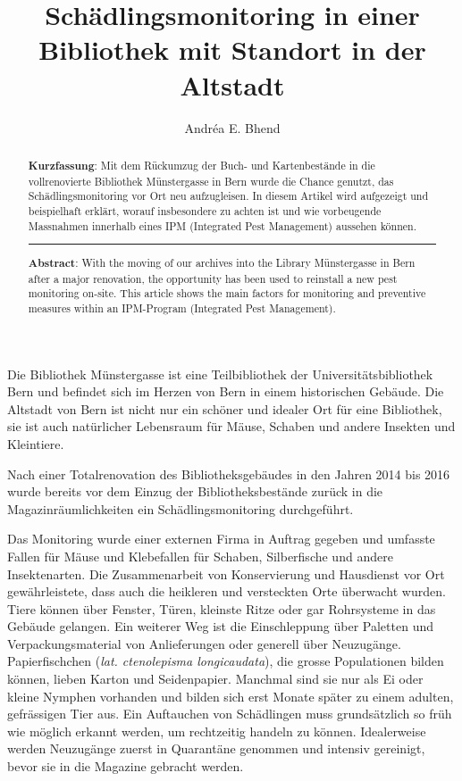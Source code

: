 \documentclass[a4paper,
fontsize=11pt,
oneside,
numbers=noperiodatend,
parskip=half-,
bibliography=totoc,
final
]{scrartcl}
\title{\LARGE{Schädlingsmonitoring in einer Bibliothek mit Standort in der Altstadt}}%
\author{Andréa E. Bhend} %
\date{}
\begin{document}
\maketitle
\thispagestyle{fancyplain} 

\begin{abstract}
\noindent
\textbf{Kurzfassung}: Mit dem Rückumzug der Buch- und Kartenbestände in
die vollrenovierte Bibliothek Münstergasse in Bern wurde die Chance
genutzt, das Schädlingsmonitoring vor Ort neu aufzugleisen. In diesem
Artikel wird aufgezeigt und beispielhaft erklärt, worauf insbesondere zu
achten ist und wie vorbeugende Massnahmen innerhalb eines IPM
(Integrated Pest Management) aussehen können.

\begin{center}\rule{0.5\linewidth}{0.5pt}\end{center}

\noindent\textbf{Abstract}: With the moving of our archives into the Library
Münstergasse in Bern after a major renovation, the opportunity has been
used to reinstall a new pest monitoring on-site. This article shows the
main factors for monitoring and preventive measures within an
IPM-Program (Integrated Pest Management).
\end{abstract}

Die Bibliothek Münstergasse ist eine Teilbibliothek der
Universitätsbibliothek Bern und befindet sich im Herzen von Bern in
einem historischen Gebäude. Die Altstadt von Bern ist nicht nur ein
schöner und idealer Ort für eine Bibliothek, sie ist auch natürlicher
Lebensraum für Mäuse, Schaben und andere Insekten und Kleintiere.

Nach einer Totalrenovation des Bibliotheksgebäudes in den Jahren 2014
bis 2016 wurde bereits vor dem Einzug der Bibliotheksbestände zurück in
die Magazinräumlichkeiten ein Schädlingsmonitoring durchgeführt.

Das Monitoring wurde einer externen Firma in Auftrag gegeben und
umfasste Fallen für Mäuse und Klebefallen für Schaben, Silberfische und
andere Insektenarten. Die Zusammenarbeit von Konservierung und
Hausdienst vor Ort gewährleistete, dass auch die heikleren und
versteckten Orte überwacht wurden. Tiere können über Fenster, Türen,
kleinste Ritze oder gar Rohrsysteme in das Gebäude gelangen. Ein
weiterer Weg ist die Einschleppung über Paletten und Verpackungsmaterial
von Anlieferungen oder generell über Neuzugänge. Papierfischchen
(\emph{lat. ctenolepisma longicaudata}), die grosse Populationen bilden
können, lieben Karton und Seidenpapier. Manchmal sind sie nur als Ei
oder kleine Nymphen vorhanden und bilden sich erst Monate später zu
einem adulten, gefrässigen Tier aus. Ein Auftauchen von Schädlingen muss
grundsätzlich so früh wie möglich erkannt werden, um rechtzeitig handeln
zu können. Idealerweise werden Neuzugänge zuerst in Quarantäne genommen
und intensiv gereinigt, bevor sie in die Magazine gebracht werden.
\end{document}
